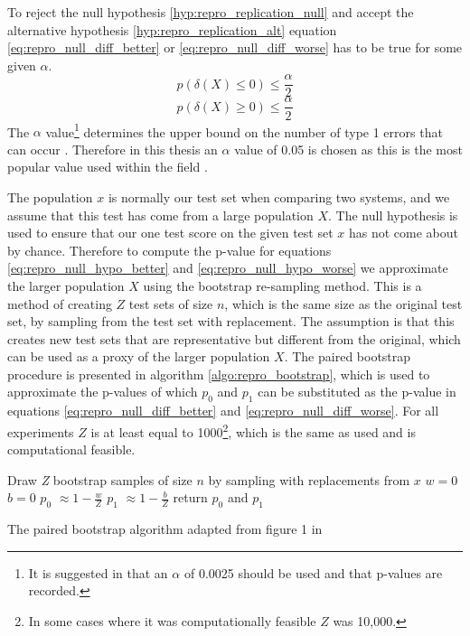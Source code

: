 To reject the null hypothesis \ref{hyp:repro_replication_null} and accept the alternative hypothesis \ref{hyp:repro_replication_alt} equation \ref{eq:repro_null_diff_better} or \ref{eq:repro_null_diff_worse} has to be true for some given $\alpha$.
\begin{equation}
    p(\delta(X) \leq 0) \le \frac{\alpha}{2}
\label{eq:repro_null_diff_better}
\end{equation}
\begin{equation}
    p(\delta(X) \geq 0) \le \frac{\alpha}{2}
\label{eq:repro_null_diff_worse}
\end{equation}
The $\alpha$ value\footnote{It is suggested in \citet{sogaard-etal-2014-whats} that an $\alpha$ of 0.0025 should be used and that p-values are recorded.} determines the upper bound on the number of type 1 errors that can occur \citep{dror-etal-2018-hitchhikers}. Therefore in this thesis an $\alpha$ value of 0.05 is chosen as this is the most popular value used within the field \citep{liu-zhang-2017-attention,he-etal-2018-exploiting}.

The population $x$ is normally our test set when comparing two systems, and we assume that this test has come from a large population $X$. The null hypothesis is used to ensure that our one test score on the given test set $x$ has not come about by chance. Therefore to compute the p-value for equations \ref{eq:repro_null_hypo_better} and \ref{eq:repro_null_hypo_worse} we approximate the larger population $X$ using the bootstrap re-sampling method. This is a method of creating $Z$ test sets of size $n$, which is the same size as the original test set, by sampling from the test set with replacement. The assumption is that this creates new test sets that are representative but different from the original, which can be used as a proxy of the larger population $X$. The paired bootstrap procedure is presented in algorithm \ref{algo:repro_bootstrap}, which is used to approximate the p-values of which $p_0$ and $p_1$ can be substituted as the p-value in equations \ref{eq:repro_null_diff_better} and \ref{eq:repro_null_diff_worse}. For all experiments $Z$ is at least equal to 1000\footnote{In some cases where it was computationally feasible $Z$ was 10,000.}, which is the same as \citet{koehn-2004-statistical} used and is computational feasible. 

\begin{algorithm}
    Draw \textit{Z} bootstrap samples of size $n$ by sampling with replacements from $x$\;
    $w = 0$\;
    $b = 0$\;
    $p_0$ $\approx 1 - \frac{w}{Z}$\;
    $p_1$ $\approx 1 - \frac{b}{Z}$\;
    return $p_0$ and $p_1$\;
    \caption{The paired bootstrap algorithm adapted from figure 1 in \citet{berg-kirkpatrick-etal-2012-empirical}}
    \label{algo:repro_bootstrap}
\end{algorithm}

